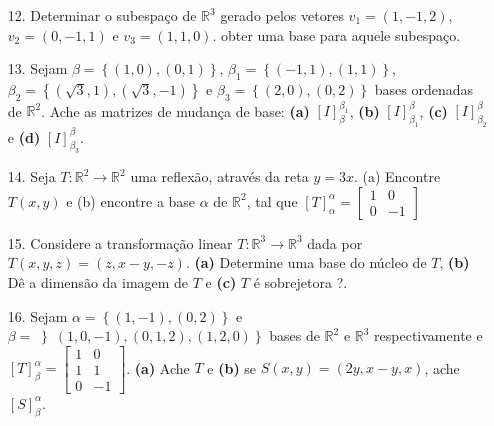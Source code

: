 \begin{itemize}
	\item [12.] Determinar o subespaço de $\mathbb{R}^{3}$ gerado pelos vetores $v_{1}=(1,-1,2)$, $v_{2}=(0,-1,1)$ e  $v_{3}=(1,1,0)$. obter uma base para aquele subespaço.
\end{itemize}
\begin{itemize}
	\item [13.] Sejam $\beta=\left\lbrace (1,0),(0,1)\right\rbrace $, $\beta_{1}=\left\lbrace (-1,1),(1,1)\right\rbrace $, $\beta_{2}=\left\lbrace (\sqrt{3},1),(\sqrt{3},-1) \right\rbrace $ e $\beta_{3}=\left\lbrace (2,0),(0,2)\right\rbrace $ bases ordenadas de $\mathbb{R}^{2}$. Ache as matrizes de mudança de base: \textbf{(a)} $[I]^{\beta_{1}}_{\beta}$, \textbf{(b)} $[I]^{\beta}_{\beta_{1}}$, \textbf{(c)} $[I]^{\beta}_{\beta_{2}}$ e \textbf{(d)} $[I]^{\beta}_{\beta_{3}}$.
\end{itemize}
\begin{itemize}
	\item [14.] Seja $T:\mathbb{R}^{2}\longrightarrow \mathbb{R}^{2}$ uma reflexão, através da reta $y=3x$. (a) Encontre $T(x,y)$ e (b) encontre a base $\alpha$ de $\mathbb{R}^{2}$, tal que $[T]^{\alpha}_{\alpha}=
	\begin{bmatrix}
	1     & 0  \\
	0     & -1 
	\end{bmatrix} $
\end{itemize}
\begin{itemize}
	\item [15.] Considere a transformação linear $T:\mathbb{R}^{3}\longrightarrow \mathbb{R}^{3}$ dada por $T(x,y,z)=(z,x-y,-z)$. \textbf{(a)} Determine uma base do núcleo de $T$, \textbf{(b)} Dê a dimensão da imagem de $T$ e \textbf{(c)} $T$ é sobrejetora ?.
\end{itemize}
\begin{itemize}
	\item [16.] Sejam $\alpha=\left\lbrace (1,-1),(0,2)\right\rbrace $ e $\beta=\left\rbrace (1,0,-1), (0,1,2), (1,2,0) \right\rbrace $ bases de $\mathbb{R}^{2}$ e $\mathbb{R}^{3}$ respectivamente e $[T]^{\alpha}_{\beta}=
	\begin{bmatrix}
	1     & 0  \\
	1     & 1  \\
	0     & -1 
	\end{bmatrix} $. \textbf{(a)} Ache $T$ e \textbf{(b)} se $S(x,y)=(2y,x-y,x)$, ache $[S]^{\alpha}_{\beta}$.
\end{itemize}
